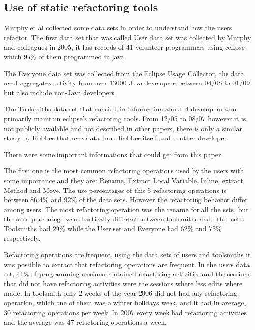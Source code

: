 
\subsection{Use of static refactoring tools}

Murphy et al \cite{murphy2012we} collected some data sets in order to understand how the users refactor.
The first data set that was called User data set was collected by Murphy and colleagues \cite{murphy2006java} in 2005, it has records of 41 volunteer programmers using eclipse which 95\% of them programmed in java. %

The Everyone data set was collected from the Eclipse Usage Collector, the data used aggregates activity from over 13000 Java developers between 04/08 to 01/09 but also include non-Java developers.

The Toolsmiths data set that consists in information about 4 developers who primarily maintain eclipse's refactoring tools. From 12/05 to 08/07 however it is not publicly available and not described in other papers, there is only a similar study by Robbes \cite{robbes2007mining} that uses data from Robbes itself and another developer. 


There were some important informations that could get from this paper.

The first one is the most common refactoring operations used by the users with some importance and they are: Rename, Extract Local Variable, Inline, extract Method and Move. The use percentages of this 5 refactoring operations is between 86.4\% and 92\% of the data sets. %
However the refactoring behavior differ among users. The most refactoring operation was the rename for all the sets, but the used percentage was drastically different between toolsmiths and other sets. Toolsmiths had 29\% while the User set and Everyone had 62\% and 75\% respectively.

Refactoring operations are frequent, using the data sets of users and toolsmiths it was possible to extract that refactoring operations are frequent. 
In the users data set, 41\% of programming sessions contained refactoring activities and the sessions that did not have refactoring activities were the sessions where less edits where made.
In toolsmith only 2 weeks of the year 2006 did not had any refactoring operation, which one of them was a winter holidays week, and it had in average, 30 refactoring operations per week. In 2007 every week had refactoring activities and the average was 47 refactoring operations a week.

